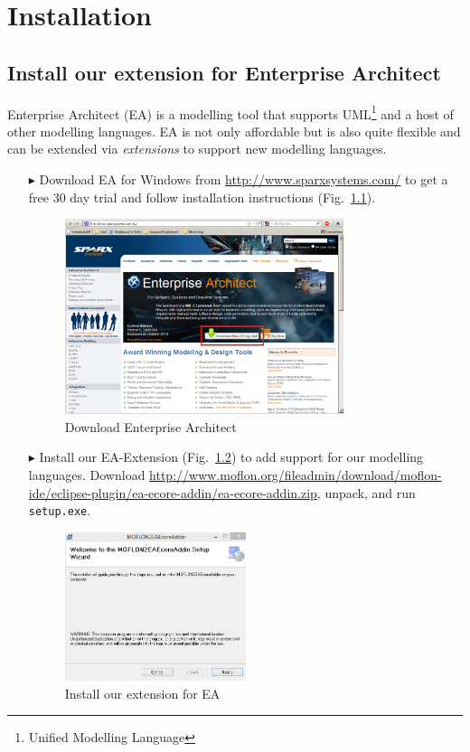 \chapter{Installation}
\label{chap:installation}

\section{Install our extension for Enterprise Architect}
Enterprise Architect (EA) is a modelling tool that supports UML\footnote{Unified Modelling Language} and a host of other modelling languages.
EA is not only affordable but is also quite flexible and can be extended via \emph{extensions} to support new modelling languages.
\begin{enumerate}
\item[$\blacktriangleright$] Download EA for Windows from \url{http://www.sparxsystems.com/} to get a free 30 day trial and follow installation instructions (Fig.~\ref{fig_enterpriseArchitextHomepage}).

\begin{figure}[htbp]
	\centering
  	\includegraphics[width=0.77\textwidth]{pics/installationAndSetup/ea_download.png}
	\caption{Download Enterprise Architect}
	\label{fig_enterpriseArchitextHomepage}
\end{figure} 

\item[$\blacktriangleright$] Install our EA-Extension (Fig.~\ref{fig_eaPluginWizard}) to add support for our modelling languages.
Download \url{http://www.moflon.org/fileadmin/download/moflon-ide/eclipse-plugin/ea-ecore-addin/ea-ecore-addin.zip}, unpack, and run \texttt{setup.exe}.

\begin{figure}[htbp]
	\centering
  \includegraphics[width=0.5\textwidth]{pics/installationAndSetup/eaplugin_install.png}
	\caption{Install our extension for EA}
	\label{fig_eaPluginWizard}
\end{figure}
\end{enumerate}
 
